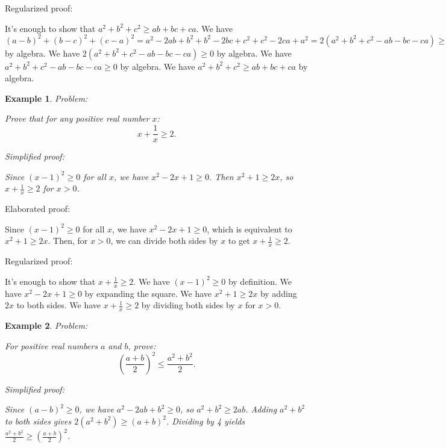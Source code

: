 \documentclass{article}
\newtheorem{example}{Example}
\begin{document}
Regularized proof:
\begin{tcolorbox}[colback=red!10, width=\linewidth]
It's enough to show that $a^2+b^2+c^2 \ge ab+bc+ca$. We have $(a-b)^2+(b-c)^2+(c-a)^2 = a^2 - 2ab + b^2 + b^2 - 2bc + c^2 + c^2 - 2ca + a^2 = 2(a^2+b^2+c^2-ab-bc-ca) \ge 0$ by algebra. We have $2(a^2+b^2+c^2-ab-bc-ca) \ge 0$ by algebra. We have $a^2+b^2+c^2-ab-bc-ca \ge 0$ by algebra. We have $a^2+b^2+c^2 \ge ab+bc+ca$ by algebra.
\end{tcolorbox}



\begin{example}
Problem:
\begin{tcolorbox}[colback=yellow!10, width=\linewidth]
Prove that for any positive real number $x$:
    $$x + \frac{1}{x} \geq 2.$$
\end{tcolorbox}

Simplified proof:
\begin{tcolorbox}[colback=blue!10, width=\linewidth]
Since $(x-1)^2 \ge 0$ for all $x$, we have $x^2 - 2x + 1 \ge 0$. Then $x^2 + 1 \ge 2x$, so $x + \frac{1}{x} \ge 2$ for $x>0$.
\end{tcolorbox}
\end{example}

Elaborated proof:
\begin{tcolorbox}[colback=green!10, width=\linewidth]
Since $(x-1)^2 \ge 0$ for all $x$, we have $x^2 - 2x + 1 \ge 0$, which is equivalent to $x^2 + 1 \ge 2x$.  Then, for $x>0$, we can divide both sides by $x$ to get $x + \frac{1}{x} \ge 2$.
\end{tcolorbox}

Regularized proof:
\begin{tcolorbox}[colback=red!10, width=\linewidth]
It's enough to show that $x + \frac{1}{x} \ge 2$. We have $(x-1)^2 \ge 0$ by definition. We have $x^2 - 2x + 1 \ge 0$ by expanding the square. We have $x^2 + 1 \ge 2x$ by adding $2x$ to both sides. We have $x + \frac{1}{x} \ge 2$ by dividing both sides by $x$ for $x>0$.
\end{tcolorbox}



\begin{example}
Problem:
\begin{tcolorbox}[colback=yellow!10, width=\linewidth]
For positive real numbers $a$ and $b$, prove:
    $$\left(\frac{a+b}{2}\right)^2 \leq \frac{a^2+b^2}{2}.$$
\end{tcolorbox}

Simplified proof:
\begin{tcolorbox}[colback=blue!10, width=\linewidth]
Since $(a-b)^2 \ge 0$, we have $a^2 - 2ab + b^2 \ge 0$, so $a^2 + b^2 \ge 2ab$.  Adding $a^2 + b^2$ to both sides gives $2(a^2+b^2) \ge (a+b)^2$. Dividing by 4 yields $\frac{a^2+b^2}{2} \ge \left(\frac{a+b}{2}\right)^2$.
\end{tcolorbox}
\end{example}
\end{document}
